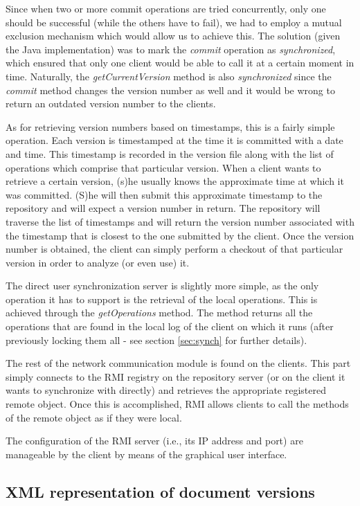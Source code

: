 Since when two or more commit operations are tried concurrently, only one should be
successful (while the others have to fail), we had to employ a mutual exclusion mechanism
which would allow us to achieve this. The solution (given the Java implementation) was to
mark the \emph{commit} operation as \emph{synchronized}, which ensured that only one client
would be able to call it at a certain moment in time. Naturally, the \emph{getCurrentVersion}
method is also \emph{synchronized} since the \emph{commit} method changes the version
number as well and it would be wrong to return an outdated version number to the clients.

As for retrieving version numbers based on timestamps, this is a fairly simple operation.
Each version is timestamped at the time it is committed with a date and time. This timestamp
is recorded in the version file along with the list of operations which comprise that
particular version. When a client wants to retrieve a certain version, (s)he usually knows
the approximate time at which it was committed. (S)he will then submit this approximate
timestamp to the repository and will expect a version number in return. The repository will
traverse the list of timestamps and will return the version number associated with the
timestamp that is closest to the one submitted by the client. Once the version number is
obtained, the client can simply perform a checkout of that particular version in order to
analyze (or even use) it.

The direct user synchronization server is slightly more simple, as the only operation it
has to support is the retrieval of the local operations. This is achieved through the
\emph{getOperations} method. The method returns all the operations that are found in the
local log of the client on which it runs (after previously locking them all - see section
\ref{sec:synch} for further details).

The rest of the network communication module is found on the clients. This part simply
connects to the RMI registry on the repository server (or on the client it wants to
synchronize with directly) and retrieves the appropriate registered remote object. Once
this is accomplished, RMI allows clients to call the methods of the remote object as if
they were local.

The configuration of the RMI server (i.e., its IP address and port) are manageable by the
client by means of the graphical user interface.

\subsection{XML representation of document versions}
\label{sec:xmlop}

